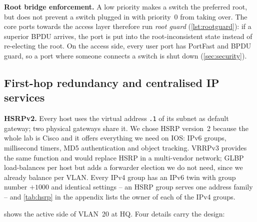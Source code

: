 
\textbf{Root bridge enforcement.} A low priority makes a switch the preferred root, but does not prevent a
switch plugged in with priority~0 from taking over. The core ports towards the access layer therefore run
\emph{root guard} (\cref{lst:rootguard}): if a superior BPDU arrives, the port is put into the
root-inconsistent state instead of re-electing the root. On the access side, every user port has PortFast
and BPDU guard, so a port where someone connects a switch is shut down (\cref{sec:security}).


\subsection{First-hop redundancy and centralised IP services}\label{sec:fhrp}
\textbf{HSRPv2.} Every host uses the virtual address \texttt{.1} of its subnet as default gateway; two
physical gateways share it. We chose HSRP version~2 \cite{rfc2281} because the whole lab is Cisco and it
offers everything we need on IOS: IPv6 groups, millisecond timers, MD5 authentication and object tracking.
VRRPv3 \cite{rfc5798} provides the same function and would replace HSRP in a multi-vendor network; GLBP
load-balances per host but adds a forwarder election we do not need, since we already balance per VLAN.
Every IPv4 group has an IPv6 twin with group number \(+1000\) and identical settings -- an HSRP group
serves one address family -- and \cref{tab:hsrp} in the appendix lists the owner of each of the
\FactNumHsrpGroups{} IPv4 groups.


 shows the active side of VLAN~20 at HQ. Four details carry the design:

